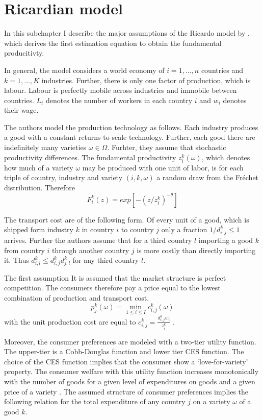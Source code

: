 \section{Ricardian model}
\label{sec:Ricardo}
In this subchapter I describe the major assumptions of the Ricardo model by \parencite{Costinot}, which derives the first estimation equation to obtain the fundamental producitivty. \par In general, the model considers a world economy of  $i = 1, \dots, n$ countries and $k = 1, \dots , K $ industries. Further, there is only one factor of production, which is labour. Labour is perfectly mobile across industries and immobile between countries. $L_i $ denotes the number of workers in each country $i$  and $ w_i $ denotes their wage. \par %
The authors model the production technology as follows.  Each industry produces a good with a constant returns to scale technology. Further, each good there are indefinitely many varieties $\omega \in \Omega$.  Furhter, they assume that stochastic productivity differences. The fundamental productivity $z_i^k(\omega)$, which denotes how much of a variety $\omega$ may be produced with one unit of labor,  is for each triple of country, industry and variety $(i,k,\omega)$ a random draw from the Fr{\'e}chet distribution. Therefore \[ F^k_i (z) = exp [-(z/z^{k}_i )^{-\theta} ] \] \par
The transport cost are of the following form. Of every unit of a good, which is shipped form industry $k$ in country $i$ to country $j$ only a fraction $1/d^k_{i,j} \leq 1$ arrives. Further the authors assume that for a third country $l$ importing a good $k$ from country $i$ through another country $j$ is more costly than directly importing it. Thus $d^k_{i,l} \leq d^k_{i,j} d^k_{j,l} $ for any third country $l$. \par
The first assumption It is assumed that the market structure is perfect competition. The consumers therefore pay a price equal to the lowest combination of production and transport cost. \[p^k_j(\omega)=\min_{1\leq i \leq I} {c_{i,j}^k(\omega)} \] with the unit production cost are equal to $c^k_{i,j}=\frac{d^k_{i,j} w_i}{z_i^k}$ . \par
Moreover, the consumer preferences are modeled with a  two-tier utility function. The upper-tier is a Cobb-Douglas function and lower tier CES function. 
The choice of the CES function implies that the consumer show a `love-for-variety' property. The consumer welfare with this utility function increases monotonically with the number of goods  for a given level of expenditures on goods and a given price of a variety   \textcite[p. 118]{helpman}. The assumed structure of consumer preferences implies the following relation for the total expenditure of any country $j$ on a variety $\omega$ of a good $k$. 
